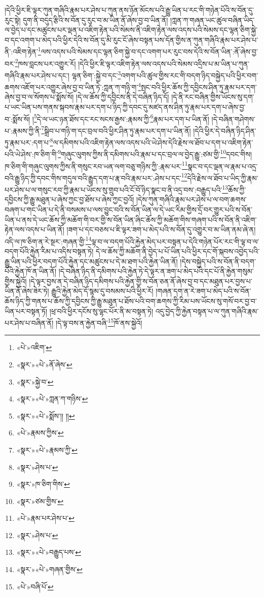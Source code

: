 །དེའི་ཕྱིར་ཇི་ལྟར་ཀུན་གཞིའི་རྣམ་པར་ཤེས་པ་ཀུན་ནས་ཉོན་མོངས་པའི་རྒྱུ་ཡིན་པ་རང་གི་གཉེན་པོའི་ས་བོན་དུ་རུང་སྟེ། དུག་ནི་བདུད་རྩིའི་ས་བོན་དུ་རུང་བ་མ་ཡིན་ནོ་ཞེས་བྱ་བ་ཡིན་ནོ། །ཀླན་ཀ་གཞན་ཡང་ཚུལ་བཞིན་ཡིད་ལ་བྱེད་པ་དང་མཚུངས་པར་ལྡན་པ་འཇིག་རྟེན་པའི་སེམས་ནི་འཇིག་རྟེན་ལས་འདས་པའི་སེམས་དང་ལྷན་ཅིག་སྐྱེ་བ་དང་འགག་པ་མེད་པའི་ཕྱིར་དེའི་ས་བོན་དུ་མི་རུང་ངོ་ཞེས་བསྟན་པས་དོན་གྱིས་ན་ཀུན་གཞིའི་རྣམ་པར་ཤེས་པ་ནི་:འཇིག་རྟེན་\footnote{«པེ་»འཇིག་}ལས་འདས་པའི་སེམས་དང་ལྷན་ཅིག་སྐྱེ་བ་དང་འགག་པར་རུང་བས་དེའི་ས་བོན་ཡིན་:ནོ་ཞེས་བྱ་བར་\footnote{«སྣར་»«པེ་»ནོ་ཞེས་}ཁས་བླངས་པར་འགྱུར་རོ། །དེའི་ཕྱིར་ཇི་ལྟར་འཇིག་རྟེན་ལས་འདས་པའི་སེམས་འདྲིས་པ་མ་ཡིན་པ་ཀུན་གཞིའི་རྣམ་པར་ཤེས་པ་དང་། ལྷན་ཅིག་:སྐྱེ་བ་དང་\footnote{«སྣར་»སྐྱེ་བ་}འགག་པའི་ཚུལ་གྱིས་རང་གི་བདག་ཉིད་བསྐྱེད་པའི་ཕྱིར་བག་ཆགས་འཇོག་པར་འགྱུར་ཞེས་བྱ་བ་ཡིན་ཏེ་:ཀླན་ཀ་གཉི་ག་\footnote{«སྣར་»«པེ་»ཀླན་ཀ་གཉིས་}སྤང་བའི་ཕྱིར་ཆོས་ཀྱི་དབྱིངས་ཤིན་ཏུ་རྣམ་པར་དག་ཞེས་བྱ་བ་ལ་སོགས་པ་སྨོས་སོ། །དེ་ལ་ཆོས་ཀྱི་དབྱིངས་ནི་དེ་བཞིན་ཉིད་དོ། །དེ་ནི་རང་བཞིན་གྱིས་ཡོངས་སུ་དག་པ་ཡང་ཡིན་པས་གནས་སྐབས་རྣམ་པར་དག་པ་ཉིད་ཀྱི་དབང་དུ་མཛད་ནས་ཤིན་ཏུ་རྣམ་པར་དག་པ་ཞེས་བྱ་བ་:སྨོས་སོ། །\footnote{«སྣར་»«པེ་»སྨོས་།། །།}དེ་ལ་ཡང་ཉན་ཐོས་དང་རང་སངས་རྒྱས་:རྣམས་ཀྱི་\footnote{«པེ་»རྣམས་ཀྱིས་}རྣམ་པར་དག་པ་ཡིན་ནོ། །དེ་བཞིན་གཤེགས་པ་:རྣམས་ཀྱི་ནི་\footnote{«སྣར་»«པེ་»རྣམས་ཀྱི་}སྒྲིབ་པ་གཉི་ག་དང་བྲལ་བའི་ཕྱིར་ཤིན་ཏུ་རྣམ་པར་དག་པ་ཡིན་ནོ། །དེའི་ཕྱིར་དེ་བཞིན་ཉིད་ཤིན་ཏུ་རྣམ་པར་:དག་པ་\footnote{«སྣར་»ཤེས་པ་}ལ་དམིགས་པའི་འཇིག་རྟེན་ལས་འདས་པའི་ཡེ་ཤེས་དེའི་རྗེས་ལ་ཐོབ་པ་དག་པ་འཇིག་རྟེན་པའི་ཡེ་ཤེས་:ཁ་ཅིག་གི་\footnote{«སྣར་»ཁ་ཅིག་གིས་}གཞུང་ལུགས་ཀྱིས་ནི་དམིགས་པའི་རྣམ་པ་དང་བྲལ་ལ་བྱེད་རྒྱུ་:ཙམ་གྱི་\footnote{«སྣར་»ཙམ་གྱིས་}དབང་གིས། ཁ་ཅིག་གི་གཞུང་ལུགས་ཀྱིས་ནི་གསུང་རབ་ཡན་ལག་བཅུ་གཉིས་ཀྱི་:རྣམ་པར་\footnote{«པེ་»རྣམ་པར་ཤེས་པ་}སྣང་བ་དང་ལྡན་ལ་རྣམ་པ་འདྲ་བའི་རྒྱུ་ཉིད་ཀྱི་དབང་གིས་གདུལ་བའི་རྒྱུད་དག་པ་རྣ་བའི་རྣམ་པར་:ཤེས་པ་དང་\footnote{«སྣར་»ཤེས་པ་}དེའི་རྗེས་ལ་ཐོབ་པ་ཡིད་ཀྱི་རྣམ་པར་ཤེས་པ་ལ་གསུང་རབ་ཀྱི་རྣམ་པ་ཡོངས་སུ་གྲུབ་པའི་ངོ་བོ་ཉིད་སྣང་བ་ནི་འདྲ་བས་:བརྒྱུད་པའི་\footnote{«སྣར་»«པེ་»བརྒྱུད་པས་}ཆོས་ཀྱི་དབྱིངས་ཀྱི་རྒྱུ་མཐུན་པ་ཞེས་ཀྱང་བྱ་ཐོས་པ་ཞེས་ཀྱང་བྱའོ། །དེས་ཀུན་གཞིའི་རྣམ་པར་ཤེས་པ་ལ་བག་ཆགས་བཞག་པ་གང་ཡིན་པ་དེ་ནི་བསམས་པ་ལས་བྱུང་བའི་ས་བོན་ཡིན་ལ་དེ་ཡང་རིམ་གྱིས་དྲོ་བར་གྱུར་པའི་ས་བོན་ཡིན་པ་ནས་དེ་ཡང་ཆོས་ཀྱི་མཆོག་གི་བར་གྱི་ས་བོན་ཡིན་ཞིང་ཆོས་ཀྱི་མཆོག་གིས་གཞག་པའི་ས་བོན་ནི་འཇིག་རྟེན་ལས་འདས་པ་ཡིན་ནོ། །ཟག་པ་དང་བཅས་པ་ཇི་ལྟར་ཟག་པ་མེད་པའི་ས་བོན་དུ་འགྱུར་བ་མ་ཡིན་ནམ་ཞེ་ན། འདི་ལ་ཁ་ཅིག་ན་རེ་སྔར་:གཞན་གྱི་\footnote{«སྣར་»«པེ་»གཞན་གྱིས་}ལྟ་བ་ལ་བདག་པོའི་རྐྱེན་མེད་པར་བསྟན་པ་དེའི་གཉེན་པོར་རང་གི་ལྟ་བ་ལ་བདག་པོའི་རྐྱེན་རིམ་པ་འདིས་བསྟན་ཏེ། དེ་ལ་ཆོས་ཀྱི་མཆོག་ནི་བྱེད་པ་པོ་ཡིན་པའི་ཕྱིར་དང་གོ་སྐབས་འབྱེད་པའི་རྒྱུ་ཡིན་པའི་ཕྱིར་བདག་པོའི་རྐྱེན་དང་མཚུངས་པ་དེ་མ་ཐག་པའི་རྐྱེན་ཡིན་ནོ། །དེས་བསྐྱེད་པའི་ས་བོན་ནི་བདག་པོའི་རྐྱེན་ཁོ་ན་ཡིན་ནོ། །དེ་བཞིན་ཉིད་ནི་དམིགས་པའི་རྐྱེན་ཏེ་དེ་ལྟར་ན་ཟག་པ་མེད་པའི་དང་པོ་ནི་རྐྱེན་གསུམ་གྱིས་སྐྱེའོ། །དེ་ལྟར་བྱས་ན་དེ་བཞིན་ཉིད་དམིགས་པའི་རྐྱེན་གྱི་ས་བོན་ཅན་ནོ་ཞེས་བྱ་བ་དང་མཐུན་པར་བྱས་པ་ཡིན་ནོ་ཞེས་ཟེར་ཏེ། རྒྱུའི་རྐྱེན་མེད་དོ་སྙམ་དུ་བསམས་པའི་ཕྱིར་རོ། །གཞན་དག་ན་རེ་ཟག་པ་མེད་པའི་ས་བོན་ཆོས་ཉིད་ཀྱི་གནས་པ་ཆོས་ཀྱི་དབྱིངས་ཀྱི་རྒྱུ་མཐུན་པ་ཐོས་པའི་བག་ཆགས་ཀྱི་རིམ་པས་ཡོངས་སུ་གསོ་བར་བྱ་བ་ཡིན་པར་བསྟན་ཏོ། །ཕྲ་བའི་ཕྱིར་དངོས་སུ་ལྷང་པོར་ནི་མ་བསྟན་ཏེ། འདུ་བྱེད་ཀྱི་རྐྱེན་བསྟན་པ་ལ་ཀུན་གཞིའི་རྣམ་པར་ཤེས་པ་བཞིན་ནོ། །དེ་ལྟ་བས་ན་རྐྱེན་བཞི་\footnote{«པེ་»བཞི་པོ་}ཁོ་ནས་སྐྱེའོ། 